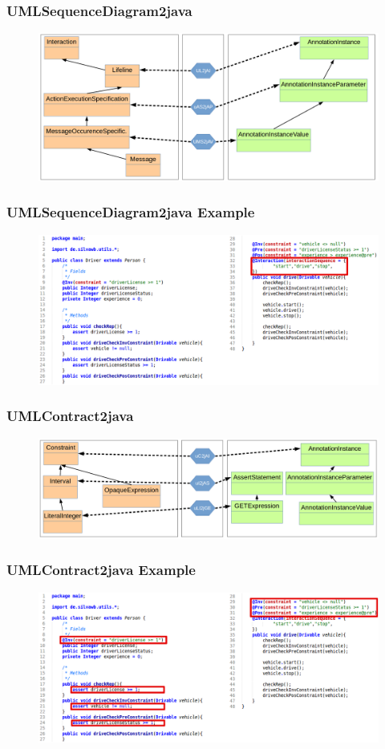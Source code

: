 \documentclass{beamer}
\begin{document}
\begin{frame}
	\frametitle{UMLSequenceDiagram2java}
	\begin{figure}
		\includegraphics[width=.8\textwidth]{umlSequenceDiagram2java_type}
	\end{figure}
\end{frame}

\begin{frame}
	\frametitle{UMLSequenceDiagram2java Example}
	\begin{figure}
		\includegraphics[width=330pt]{javaMetamodelExample01_Text_Sequence}
	\end{figure}
\end{frame}

\begin{frame}
	\frametitle{UMLContract2java}
	\begin{figure}
		\includegraphics[width=.8\textwidth]{umlContract2java_type}
	\end{figure}
\end{frame}

\begin{frame}
	\frametitle{UMLContract2java Example}
	\begin{figure}
		\includegraphics[width=330pt]{javaMetamodelExample01_Text_Contract}
	\end{figure}
\end{frame}
\end{document}
